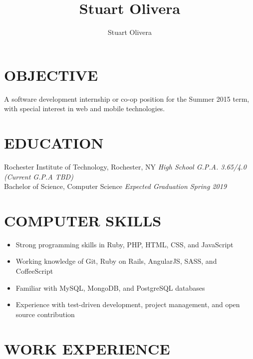 \documentclass[line]{res}
\author{Stuart Olivera}
\title{Stuart Olivera}
\begin{document}
\setlength{\textheight}{11.5in} %
\address{\large
  42960 Deer Chase Pl
  \\
  Ashburn, VA 20147
  \\
  (703) 509-9523
}
\address{\it
  stuart@stuartolivera.com
  \\
  http://stuartolivera.com/
  \\
  http://linkedin.com/in/stuartolivera
}

\begin{resume}

\section{OBJECTIVE}

  A software development internship or co-op position for the Summer 2015 term, with special interest in web and mobile technologies.

\section{EDUCATION}

  Rochester Institute of Technology, Rochester, NY
  \hfill
  \textit{High School G.P.A. 3.65/4.0 (Current G.P.A TBD)}
  \\
  Bachelor of Science, Computer Science
  \hfill
  \textit{Expected Graduation Spring 2019}

\section{COMPUTER SKILLS}

  \begin{itemize}[leftmargin=10pt]
  \item Strong programming skills in Ruby, PHP, HTML, CSS, and JavaScript
  \item Working knowledge of Git, Ruby on Rails, AngularJS, SASS, and CoffeeScript
  \item Familiar with MySQL, MongoDB, and PostgreSQL databases
  \item Experience with test-driven development, project management, and open source contribution
  \end{itemize}

\section{WORK EXPERIENCE}


\end{resume}
\end{document}
